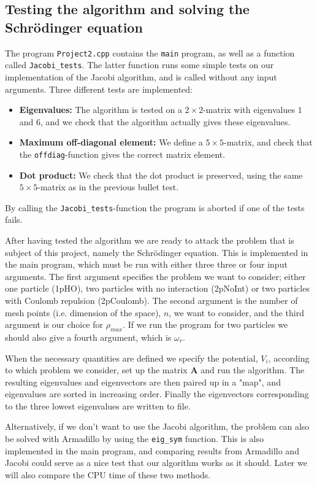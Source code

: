\documentclass[12pt, a4paper]{article}
\begin{document}
\subsection{Testing the algorithm and solving the Schrödinger equation}

The program \texttt{Project2.cpp} contains the \texttt{main} program, as well as a function called 
\texttt{Jacobi\_tests}. The latter function runs some simple tests on our implementation of the 
Jacobi algorithm, and is called without any input arguments. Three different tests are implemented: 
\begin{itemize}
\item \textbf{Eigenvalues:} The algorithm is tested on a $2\times 2$-matrix with eigenvalues $1$ and $6$, 
and we check that the algorithm actually gives these eigenvalues.  
\item \textbf{Maximum off-diagonal element:} We define a $5\times 5$-matrix, and check that the 
\texttt{offdiag}-function gives the correct matrix element. 
\item \textbf{Dot product:} We check that the dot product is preserved, using the same $5\times 5$-matrix 
as in the previous bullet test. 
\end{itemize}
By calling the \texttt{Jacobi\_tests}-function the program is aborted if one of the tests fails. 

After having tested the algorithm we are ready to attack the problem that is subject of this project, 
namely the Schrödinger equation. This is implemented in the main program, which must be run with either 
three three or four input arguments. The first argument specifies the problem we want to consider; 
either one particle (1pHO), two particles with no interaction (2pNoInt) or two particles with Coulomb 
repulsion (2pCoulomb). The second argument is the number of mesh points (i.e. dimension of the space), 
$n$, we want to consider, and the third argument is our choice for $\rho_{max}$. If we run the program 
for two particles we should also give a fourth argument, which is $\omega_r$.  

When the necessary quantities are defined we specify the potential, $V_i$, according to which problem 
we consider, set up the matrix $\mathbf{A}$ and run the algorithm. The resulting eigenvalues and
eigenvectors are then paired up in a "map", and eigenvalues are sorted in increasing order. 
Finally the eigenvectors corresponding to the three lowest eigenvalues are written to file.  

Alternatively, if we don't want to use the Jacobi algorithm, the problem can also be solved with Armadillo 
\cite{Armadillo} by using the \texttt{eig\_sym} function. This is also implemented in the main program, 
and comparing results from Armadillo and Jacobi could serve as a nice test that our algorithm works as 
it should. Later we will also compare the CPU time of these two methods. 
\end{document}
